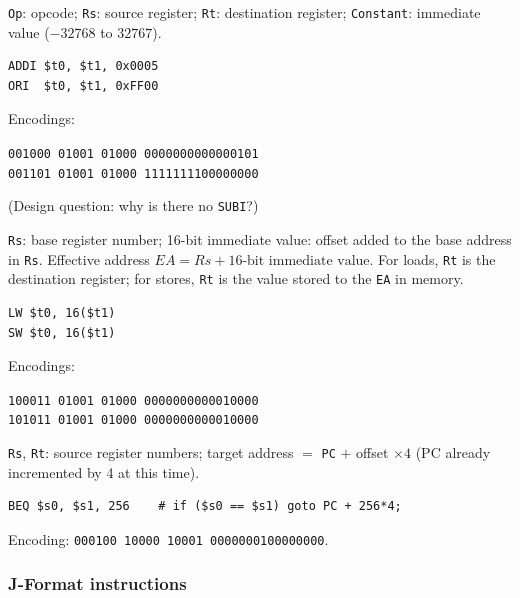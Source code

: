 \begin{eg}
\texttt{Op}: opcode;
\texttt{Rs}: source register; \texttt{Rt}: destination register;
\texttt{Constant}: immediate value ($-32768$ to $32767$).
\begin{lstlisting}
ADDI $t0, $t1, 0x0005
ORI  $t0, $t1, 0xFF00
\end{lstlisting}
Encodings:
\begin{center}
\texttt{001000 01001 01000 0000000000000101}\\
\texttt{001101 01001 01000 1111111100000000}
\end{center}
(Design question: why is there no \texttt{SUBI}?)
\end{eg}

\begin{eg}
\texttt{Rs}: base register number;
16-bit immediate value: offset added to the base address in \texttt{Rs}.
Effective address $EA = Rs + \text{16-bit immediate value}$. For loads,
\texttt{Rt} is the destination register; for stores, \texttt{Rt} is the
value stored to the \texttt{EA} in memory.
\begin{lstlisting}
LW $t0, 16($t1)
SW $t0, 16($t1)
\end{lstlisting}
Encodings:
\begin{center}
\texttt{100011 01001 01000 0000000000010000}\\
\texttt{101011 01001 01000 0000000000010000}
\end{center}
\end{eg}

\begin{eg}
\texttt{Rs}, \texttt{Rt}: source
register numbers; target address $=$ \texttt{PC} $+$ offset $\times 4$ (PC
already incremented by 4 at this time).
\begin{lstlisting}
BEQ $s0, $s1, 256    # if ($s0 == $s1) goto PC + 256*4;
\end{lstlisting}
Encoding: \texttt{000100 10000 10001 0000000100000000}.
\end{eg}

\subsubsection{J-Format instructions}

\begin{center}\begin{minipage}{\linewidth}\centering
{}
\end{minipage}
\end{center}

